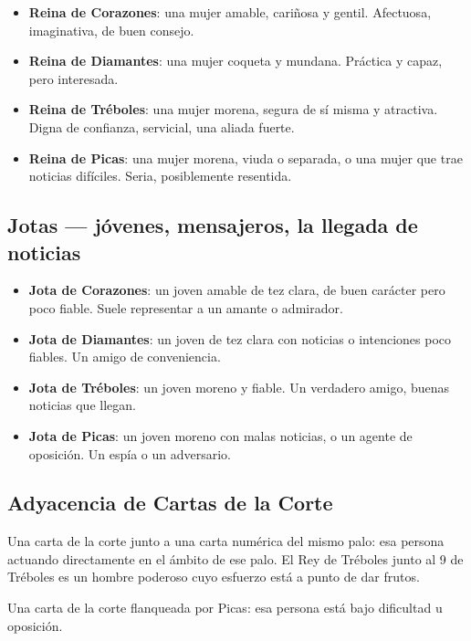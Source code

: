 \begin{itemize}
\tightlist
\item
  \textbf{Reina de Corazones}: una mujer amable, cariñosa y gentil. Afectuosa, imaginativa, de buen consejo.
\item
  \textbf{Reina de Diamantes}: una mujer coqueta y mundana. Práctica y capaz, pero interesada.
\item
  \textbf{Reina de Tréboles}: una mujer morena, segura de sí misma y atractiva. Digna de confianza, servicial, una aliada fuerte.
\item
  \textbf{Reina de Picas}: una mujer morena, viuda o separada, o una mujer que trae noticias difíciles. Seria, posiblemente resentida.
\end{itemize}

\subsection{Jotas --- jóvenes, mensajeros, la llegada de noticias}\label{jacks--young-people-messengers-the-approach-of-news}

\begin{itemize}
\tightlist
\item
  \textbf{Jota de Corazones}: un joven amable de tez clara, de buen carácter pero poco fiable. Suele representar a un amante o admirador.
\item
  \textbf{Jota de Diamantes}: un joven de tez clara con noticias o intenciones poco fiables. Un amigo de conveniencia.
\item
  \textbf{Jota de Tréboles}: un joven moreno y fiable. Un verdadero amigo, buenas noticias que llegan.
\item
  \textbf{Jota de Picas}: un joven moreno con malas noticias, o un agente de oposición. Un espía o un adversario.
\end{itemize}

\subsection{Adyacencia de Cartas de la Corte}\label{court-card-adjacency}

Una carta de la corte junto a una carta numérica del mismo palo: esa persona actuando directamente en el ámbito de ese palo. El Rey de Tréboles junto al 9 de Tréboles es un hombre poderoso cuyo esfuerzo está a punto de dar frutos.

Una carta de la corte flanqueada por Picas: esa persona está bajo dificultad u oposición.

